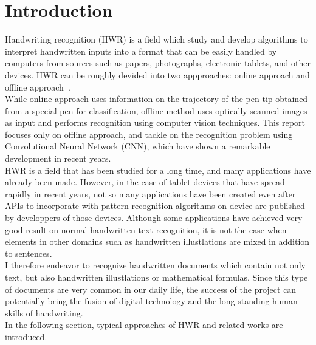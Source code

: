 \section{Introduction}

Handwriting recognition (HWR) is a field which study and develop algorithms to
interpret handwritten inputs into a format that can be easily handled by computers
from sources such as papers, photographs, electronic tablets, and other devices.
HWR can be roughly devided into two appproaches:
online approach and offline approach~\cite{plamondon2000online}.\\
While online approach uses information on the trajectory of the pen tip
obtained from a special pen for classification, offline method uses
optically scanned images as input and performs recognition using computer vision techniques.
This report focuses only on offline approach, and tackle on the recognition problem
using Convolutional Neural Network (CNN), which have shown a remarkable development in recent years.\\
HWR is a field that has been studied for a long time, and many applications have already been made.
However, in the case of tablet devices that have spread rapidly in recent years, not so many applications
have been created even after APIs to incorporate with pattern recognition algorithms on device are published
by developpers of those devices. Although some applications have achieved very good
result on normal handwritten text recognition, it is not the case when elements in other domains
such as handwritten illustlations are mixed in addition to sentences.\\
I therefore endeavor to recognize handwritten documents which contain not only text, but also
handwritten illustlations or mathematical formulas. Since this type of documents are very common
in our daily life, the success of the project can potentially bring the fusion of digital
technology and the long-standing human skills of handwriting. \\
In the following section, typical approaches of HWR and related works are introduced.

